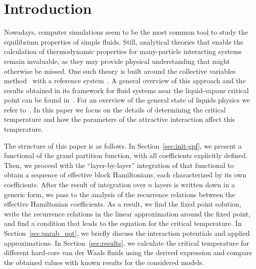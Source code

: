 \section{Introduction}

Nowadays, computer simulations seem to be the most common tool to study the equilibrium properties of simple fluids. Still, analytical theories that enable the calculation of thermodynamic properties for many-particle interacting systems remain invaluable, as they may provide physical understanding that might otherwise be missed. One such theory is built around the collective variables method~\cite{Yukh1980book} with a reference system~\cite{Yukh1990}. A general overview of this approach and the results obtained in its framework for fluid systems near the liquid-vapour critical point can be found in~\cite{Yukh2015En}. For an overview of the general state of liquids physics we refer to~\cite{hansen2013theory,adamBulavin2006book}. In this paper we focus on the details of determining the critical temperature and how the parameters of the attractive interaction affect this temperature. 

The structure of this paper is as follows. In Section~\ref{sec:init-gpf}, we present a functional of the grand partition function, with all coefficients explicitly defined. Then, we proceed with the ``layer-by-layer'' integration of that functional to obtain a sequence of effective block Hamiltonians, each characterized by its own coefficients. After the result of integration over $n$ layers is written down in a generic form, we pass to the analysis of the recurrence relations between the effective Hamiltonian coefficients. As a result, we find the fixed point solution, write the recurrence relations in the linear approximation around the fixed point, and find a condition that leads to the equation for the critical temperature. In Section~\ref{sec:parab_pot}, we briefly discuss the interaction potentials and applied approximations. In Section~\ref{sec:results}, we calculate the critical temperature for different hard-core van der Waals fluids using the derived expression and compare the obtained values with known results for the considered models.

